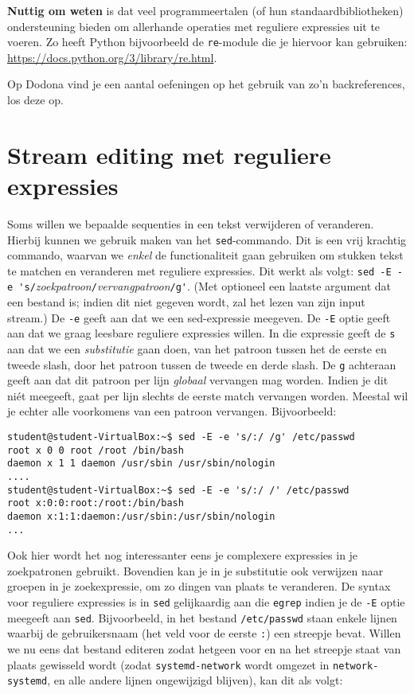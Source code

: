 \documentclass[a4paper,twoside,openany]{memoir}
\begin{document}
\textbf{Nuttig om weten} is dat veel programmeertalen (of hun
standaardbibliotheken) ondersteuning bieden om allerhande operaties met
reguliere expressies uit te voeren. Zo heeft Python bijvoorbeeld de
\verb!re!-module die je hiervoor kan gebruiken:
\url{https://docs.python.org/3/library/re.html}.

Op Dodona vind je een aantal oefeningen op het gebruik van zo'n backreferences,
los deze op.

\section{Stream editing met reguliere expressies}

Soms willen we bepaalde sequenties in een tekst verwijderen of veranderen.
Hierbij kunnen we gebruik maken van het \verb!sed!-commando. Dit is een vrij
krachtig commando, waarvan we \emph{enkel} de functionaliteit gaan gebruiken om
stukken tekst te matchen en veranderen met reguliere expressies. Dit werkt als
volgt: \verb!sed -E -e 's/!\emph{zoekpatroon}\verb!/!\emph{vervangpatroon}\verb!/g'!. (Met optioneel
een laatste argument dat een bestand is; indien dit niet gegeven wordt, zal het
lezen van zijn input stream.) De \verb!-e! geeft aan dat we een sed-expressie
meegeven. De \verb!-E! optie geeft aan dat we graag leesbare reguliere expressies willen.
In die expressie geeft de \verb!s! aan dat we een \emph{substitutie}
gaan doen, van het patroon tussen het de eerste en tweede slash, door het
patroon tussen de tweede en derde slash. De \verb!g! achteraan geeft aan dat dit
patroon per lijn \emph{globaal} vervangen mag worden. Indien je dit niét
meegeeft, gaat per lijn slechts de eerste match vervangen worden. Meestal wil je
echter alle voorkomens van een patroon vervangen. Bijvoorbeeld:

\begin{verbatim}
student@student-VirtualBox:~$ sed -E -e 's/:/ /g' /etc/passwd
root x 0 0 root /root /bin/bash
daemon x 1 1 daemon /usr/sbin /usr/sbin/nologin
....
student@student-VirtualBox:~$ sed -E -e 's/:/ /' /etc/passwd
root x:0:0:root:/root:/bin/bash
daemon x:1:1:daemon:/usr/sbin:/usr/sbin/nologin
...
\end{verbatim}

Ook hier wordt het nog interessanter eens je complexere expressies in je
zoekpatronen gebruikt. Bovendien kan je in je substitutie ook verwijzen naar
groepen in je zoekexpressie, om zo dingen van plaats te veranderen.
De syntax voor reguliere expressies is in \verb!sed! gelijkaardig aan die \verb!egrep!
indien je de \verb!-E! optie meegeeft aan \verb!sed!.
Bijvoorbeeld, in het bestand \verb!/etc/passwd! staan enkele lijnen waarbij de
gebruikersnaam (het veld voor de eerste \verb!:!) een streepje bevat. Willen we
nu eens dat bestand editeren zodat hetgeen voor en na het streepje staat van
plaats gewisseld wordt (zodat \verb!systemd-network! wordt omgezet in
\verb!network-systemd!, en alle andere lijnen ongewijzigd blijven), kan dit als
volgt:
\end{document}
